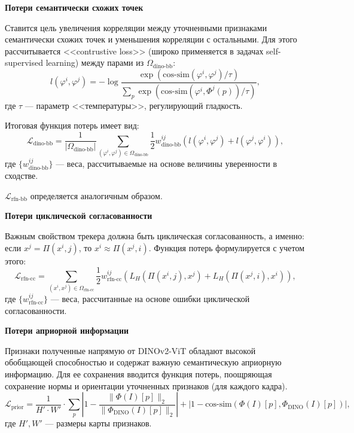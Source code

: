 \documentclass[a4paper, 14pt]{extarticle}
\theoremstyle{definition}
\theoremstyle{plain}
\theoremstyle{remark}
\begin{document}
\textbf{Потери семантически схожих точек}

Ставится цель увеличения корреляции между уточненными признаками семантически схожих точек и уменьшения корреляции с остальными. Для этого рассчитывается <<contrustive loss>> (широко применяется в задачах self-supervised learning) между парами из $\Omega_{\text{dino-bb}}$:
\begin{equation} \label{eq:bb-loss}
	l(\varphi^i, \varphi^j) = -\log \frac{\exp(\text{cos-sim}(\varphi^i, \varphi^j) / \tau)}{\sum_p \exp(\text{cos-sim}(\varphi^i, \Phi^j(p)) / \tau)},
\end{equation}
где $\tau$ --- параметр <<температуры>>, регулирующий гладкость.

Итоговая функция потерь имеет вид:
\begin{equation}
	\mathcal{L}_{\text{dino-bb}} = \frac{1}{|\Omega_{\text{dino-bb}}|} \sum_{(\varphi^i, \varphi^j) \in \Omega_{\text{dino-bb}}} \frac{1}{2} w_{\text{dino-bb}}^{ij} \left( l(\varphi^i, \varphi^j) + l(\varphi^j, \varphi^i) \right),
\end{equation}
где $\{w_{\text{dino-bb}}^{ij}\}$ --- веса, рассчитываемые на основе величины уверенности в сходстве.

$\mathcal{L}_{\text{rfn-bb}}$ определяется аналогичным образом.

\textbf{Потери циклической согласованности}

Важным свойством трекера должна быть циклическая согласованность, а именно: если $x^j = \Pi(x^i,j)$, то $x^i\approx\Pi(x^j,i)$. Функция потерь формулируется с учетом этого:
\begin{equation}
	\mathcal{L}_{\text{rfn-cc}} = \sum_{(x^i, x^j) \in \Omega_{\text{rfn-cc}}} \frac{1}{2} w_{\text{rfn-cc}}^{ij} \left( L_H(\Pi(x^i, j), x^j) + L_H(\Pi(x^j, i), x^i) \right),
\end{equation}
где $\{w_{\text{rfn-cc}}^{ij}\}$ --- веса, рассчитанные на основе ошибки циклической согласованности.

\textbf{Потери априорной информации}

Признаки полученные напрямую от DINOv2-ViT обладают высокой обобщающей способностью и содержат важную семантическую априорную информацию. Для ее сохранения вводится функция потерь, поощряющая сохранение нормы и ориентации уточненных признаков (для каждого кадра).
\begin{equation}
	\mathcal{L}_{\text{prior}} = \frac{1}{H' \cdot W'} \cdot \sum_p \left| 1 - \frac{\|\Phi(I)[p]\|_2}{\|\Phi_{\text{DINO}}(I)[p]\|_2}\right| + \left| 1 - \text{cos-sim}(\Phi(I)[p], \Phi_{\text{DINO}}(I)[p])\right|,
\end{equation}
где $H', W'$ --- размеры карты признаков.
\end{document}
